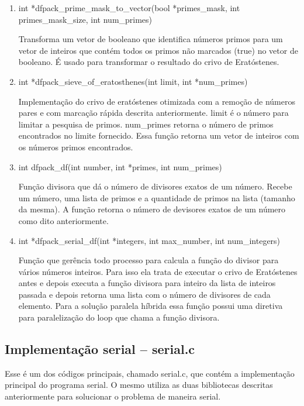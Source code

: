 \documentclass[12pt]{article}
\begin{document}
\begin{enumerate}
	\item int *dfpack\_prime\_mask\_to\_vector(bool *primes\_mask, int primes\_mask\_size, int num\_primes)

	      Transforma um vetor de booleano que identifica números primos para um vetor de inteiros que contém todos os primos não marcados (true) no vetor de booleano. É usado para transformar o resultado do crivo de Eratóstenes.

	\item int *dfpack\_sieve\_of\_eratosthenes(int limit, int *num\_primes)

	      Implementação do crivo de eratóstenes otimizada com a remoção de números pares e com marcação rápida descrita anteriormente. limit é o número para limitar a pesquisa de primos. num\_primes retorna o número de primos encontrados no limite fornecido. Essa função retorna um vetor de inteiros com os números primos encontrados.

	\item int dfpack\_df(int number, int *primes, int num\_primes)

	      Função divisora que dá o número de divisores exatos de um número. Recebe um número, uma lista de primos e a quantidade de primos na lista (tamanho da mesma). A função retorna o número de devisores exatos de um número como dito anteriormente.

	\item int *dfpack\_serial\_df(int *integers, int max\_number, int num\_integers)

	      Função que gerência todo processo para calcula a função do divisor para vários números inteiros. Para isso ela trata de executar o crivo de Eratóstenes antes e depois executa a função divisora para inteiro da lista de inteiros passada e depois retorna uma lista com o número de divisores de cada elemento. Para a solução paralela híbrida essa função possui uma diretiva para paralelização do loop que chama a função divisora.

\end{enumerate}

\subsection{Implementação serial -- serial.c}

Esse é um dos códigos principais, chamado serial.c, que contém a implementação principal do programa serial. O mesmo utiliza as duas bibliotecas descritas anteriormente para solucionar o problema de maneira serial.
\end{document}

